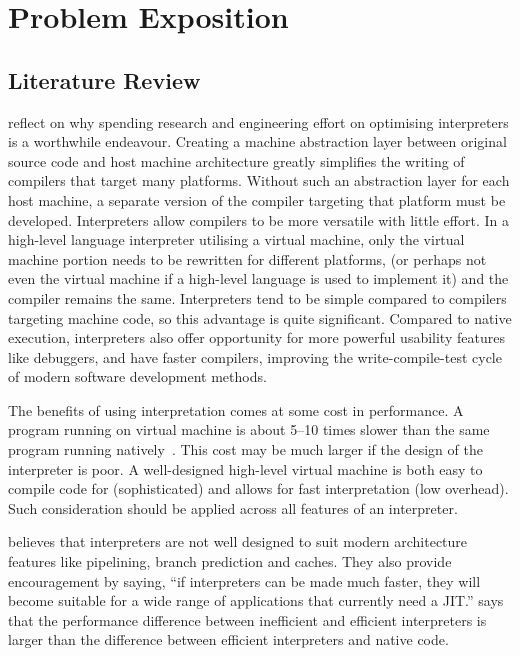 \chapter{Problem Exposition}
	\section{Literature Review}
		\cite{structureinterpreters} reflect on why spending research and engineering effort on optimising interpreters is a worthwhile endeavour. Creating a machine abstraction layer between original source code and host machine architecture greatly simplifies the writing of compilers that target many platforms. Without such an abstraction layer for each host machine, a separate version of the compiler targeting that platform must be developed. Interpreters allow compilers to be more versatile with little effort. In a high-level language interpreter utilising a virtual machine, only the virtual machine portion needs to be rewritten for different platforms, (or perhaps not even the virtual machine if a high-level language is used to implement it) and the compiler remains the same. Interpreters tend to be simple compared to compilers targeting machine code, so this advantage is quite significant. Compared to native execution, interpreters also offer opportunity for more powerful usability features like debuggers, and have faster compilers, improving the write-compile-test cycle of modern software development methods.
		
		The benefits of using interpretation comes at some cost in performance. A program running on virtual machine is about 5--10 times slower than the same program running natively~\citep{optimizingindirectbranch}. This cost may be much larger if the design of the interpreter is poor. A well-designed high-level virtual machine is both easy to compile code for (sophisticated) and allows for fast interpretation (low overhead). Such consideration should be applied across all features of an interpreter.
		
		\cite{fastjava} believes that interpreters are not well designed to suit modern architecture features like pipelining, branch prediction and caches. They also provide encouragement by saying, ``if interpreters can be made much faster, they will become suitable for a wide range of applications that currently need a JIT.'' \cite[]{structureinterpreters} says that the performance difference between inefficient and efficient interpreters is larger than the difference between efficient interpreters and native code.
		

